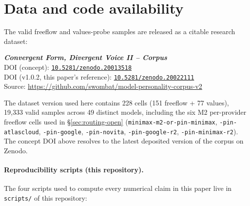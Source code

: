 \documentclass[11pt,a4paper]{article}
\begin{document}
\section*{Data and code availability}
\label{sec:data-availability}

The valid freeflow and values-probe samples are released as a citable research dataset:

\begin{center}
\textbf{\emph{Convergent Form, Divergent Voice II -- Corpus}} \\
\citep{tenner2026corpus} \quad
DOI (concept): \href{https://doi.org/10.5281/zenodo.20013518}{\texttt{10.5281/\allowbreak zenodo.20013518}} \\
DOI (v1.0.2, this paper's reference): \href{https://doi.org/10.5281/zenodo.20022111}{\texttt{10.5281/\allowbreak zenodo.20022111}} \\
Source: \url{https://github.com/swombat/model-personality-corpus-v2}
\end{center}

\begin{sloppypar}
\noindent The dataset version used here contains 228 cells (151 freeflow + 77 values), 19{,}333 valid samples across 49 distinct models, including the six M2 per-provider freeflow cells used in \S\ref{sec:routing-open} (\texttt{minimax-m2-\allowbreak or-pin-\allowbreak minimax}, \texttt{-pin-\allowbreak atlascloud}, \texttt{-pin-\allowbreak google}, \texttt{-pin-\allowbreak novita}, \texttt{-pin-\allowbreak google-r2}, \texttt{-pin-\allowbreak minimax-r2}). The concept DOI above resolves to the latest deposited version of the corpus on Zenodo.
\end{sloppypar}

\paragraph{Reproducibility scripts (this repository).} The four scripts used to compute every numerical claim in this paper live in \texttt{scripts/} of this repository:
\end{document}
